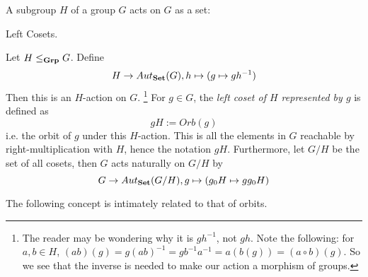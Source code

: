 \documentclass[../book.tex]{subfiles}
\begin{document}

A subgroup $H$ of a group $G$ acts on $G$ as a set: 

\begin{dfn} Left Cosets. 

    Let $H \leq_{\mathbf{Grp}} G$. 
    Define 
    \[H \to Aut_{\mathbf{Set}}(G), h \mapsto (g \mapsto gh^{-1})\]
    Then this is an $H$-action on $G$. \footnote{
        The reader may be wondering why it is $gh^{-1}$, not $gh$.
        Note the following: for $a, b \in H$, 
        $(ab)(g) = g(ab)^{-1} = gb^{-1}a^{-1} = a(b(g)) = (a \circ b)(g)$.
        So we see that the inverse is needed to make our action a morphism of groups.
    }
    For $g \in G$, 
    the \emph{left coset of $H$ represented by $g$} is defined as
    \[gH := Orb(g)\]
    i.e. the orbit of $g$ under this $H$-action. 
    This is all the elements in $G$ reachable by 
    right-multiplication with $H$, hence the notation $gH$. 
    Furthermore, let $G / H$ be the set of all cosets, 
    then $G$ acts naturally on $G / H$ by
    \[G \to Aut_{\mathbf{Set}}(G / H), g \mapsto (g_0H \mapsto gg_0H)\]
\end{dfn}

The following concept is intimately related to that of orbits. 
\end{document}
